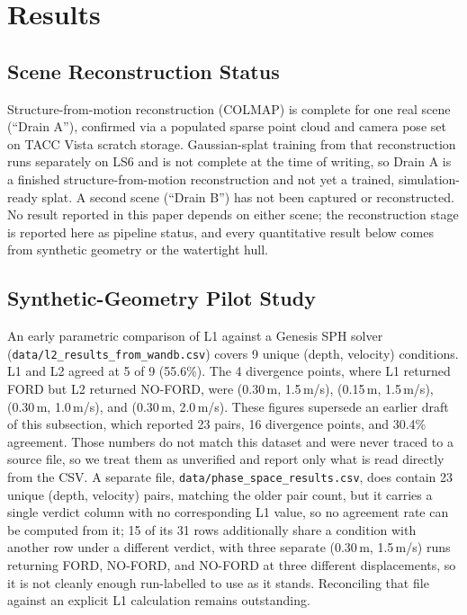 \documentclass[conference]{IEEEtran}
\begin{document}
\section{Results}
\label{sec:results}

\subsection{Scene Reconstruction Status}
Structure-from-motion reconstruction (COLMAP) is complete for one real scene (``Drain A''), confirmed via a populated sparse point cloud and camera pose set on TACC Vista scratch storage. Gaussian-splat training from that reconstruction runs separately on LS6 and is not complete at the time of writing, so Drain A is a finished structure-from-motion reconstruction and not yet a trained, simulation-ready splat. A second scene (``Drain B'') has not been captured or reconstructed. No result reported in this paper depends on either scene; the reconstruction stage is reported here as pipeline status, and every quantitative result below comes from synthetic geometry or the watertight hull.

\subsection{Synthetic-Geometry Pilot Study}
An early parametric comparison of L1 against a Genesis SPH solver (\texttt{data/l2\_results\_from\_wandb.csv}) covers 9 unique (depth, velocity) conditions. L1 and L2 agreed at 5 of 9 (55.6\%). The 4 divergence points, where L1 returned FORD but L2 returned NO-FORD, were (0.30\,m, 1.5\,m/s), (0.15\,m, 1.5\,m/s), (0.30\,m, 1.0\,m/s), and (0.30\,m, 2.0\,m/s). These figures supersede an earlier draft of this subsection, which reported 23 pairs, 16 divergence points, and 30.4\% agreement. Those numbers do not match this dataset and were never traced to a source file, so we treat them as unverified and report only what is read directly from the CSV. A separate file, \texttt{data/phase\_space\_results.csv}, does contain 23 unique (depth, velocity) pairs, matching the older pair count, but it carries a single verdict column with no corresponding L1 value, so no agreement rate can be computed from it; 15 of its 31 rows additionally share a condition with another row under a different verdict, with three separate (0.30\,m, 1.5\,m/s) runs returning FORD, NO-FORD, and NO-FORD at three different displacements, so it is not cleanly enough run-labelled to use as it stands. Reconciling that file against an explicit L1 calculation remains outstanding.
\end{document}
